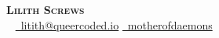 \begin{center}
    \textbf{\color{accent1}\Huge \scshape Lilith Screws} \\ \vspace{1pt}
    \small \color{accent2}\faPhone\color{black}\ \PhoneNumber{} 
    \href{mailto:lilith@queercoded.io}{\color{accent2}\faEnvelope\color{black}\ litith@queercoded.io} 
    \href{https://github.com/motherofdaemons}{\color{accent2}\faGithubSquare\color{black}\ motherofdaemons}
\end{center}
